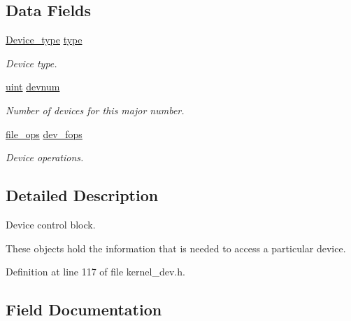 \subsection*{Data Fields}
\begin{DoxyCompactItemize}
\item 
\hyperlink{group__dev_ga879ceac20e83b2375e5b49f4379b0c90}{Device\+\_\+type} \hyperlink{structdevice__control__block_a35a45268132777177a33513c747633c4}{type}
\begin{DoxyCompactList}\small\item\em Device type. \end{DoxyCompactList}\item 
\mbox{\label{structdevice__control__block_a25d8f038a1c6d41f445d078276117fba}} 
\hyperlink{bios_8h_a91ad9478d81a7aaf2593e8d9c3d06a14}{uint} \hyperlink{structdevice__control__block_a25d8f038a1c6d41f445d078276117fba}{devnum}
\begin{DoxyCompactList}\small\item\em Number of devices for this major number. \end{DoxyCompactList}\item 
\hyperlink{group__dev_gaab625d8ae3a95e942ed10ed1579f5042}{file\+\_\+ops} \hyperlink{structdevice__control__block_a2945d5da96f40ff7fae94e295624a7c7}{dev\+\_\+fops}
\begin{DoxyCompactList}\small\item\em Device operations. \end{DoxyCompactList}\end{DoxyCompactItemize}


\subsection{Detailed Description}
Device control block. 

These objects hold the information that is needed to access a particular device. 

Definition at line 117 of file kernel\+\_\+dev.\+h.



\subsection{Field Documentation}
\mbox{\label{structdevice__control__block_a2945d5da96f40ff7fae94e295624a7c7}} 
